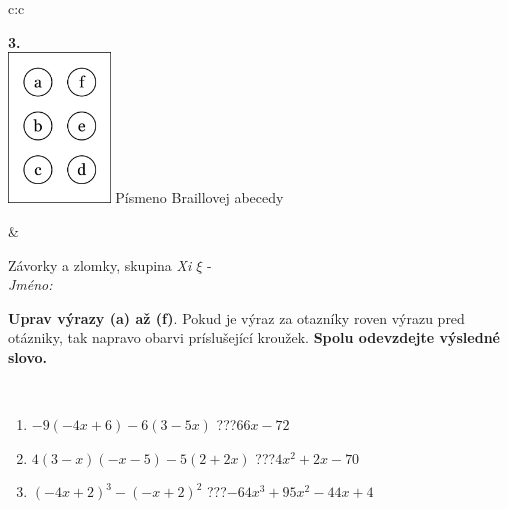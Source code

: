 \documentclass[10pt]{report}
\begin{document}
\begin{tabular}{c:c}
\begin{minipage}[c][104.5mm][t]{0.5\linewidth}
\begin{center}
\begin{minipage}{0.79\linewidth}
\begin{center}
\begin{varwidth}{\linewidth}
\begin{enumerate}
\end{enumerate}
\end{varwidth}
\end{center}
\end{minipage}
\begin{minipage}{0.20\linewidth}
\begin{center}
{\Huge\bfseries 3.} \\[2mm]
\includegraphics[height=40mm]{../images/braille.png}
{\small Písmeno Braillovej abecedy}
\end{center}
\end{minipage}
\end{center}
\end{minipage}
&
\begin{minipage}[c][104.5mm][t]{0.5\linewidth}
\begin{center}
\vspace{7mm}
{\huge Závorky a zlomky, skupina \textit{Xi $\xi$} -}\\[5mm]
\textit{Jméno:}\phantom{xxxxxxxxxxxxxxxxxxxxxxxxxxxxxxxxxxxxxxxxxxxxxxxxxxxxxxxxxxxxxxxxx}\\[5mm]
\begin{minipage}{0.95\linewidth}
\begin{center}
\textbf{Uprav výrazy (a) až (f)}. Pokud je výraz za otazníky roven výrazu pred otázniky, tak napravo obarvi príslušející kroužek. \textbf{Spolu odevzdejte výsledné slovo.}
\end{center}
\end{minipage}
\\[1mm]
\begin{minipage}{0.79\linewidth}
\begin{center}
\begin{varwidth}{\linewidth}
\begin{enumerate}
\normalsize
\item $-9(-4x+6)-6(3-5x)$\quad \dotfill\; ???\;\dotfill \quad $66x-72$
\item $4(3-x)(-x-5)-5(2+2x)$\quad \dotfill\; ???\;\dotfill \quad $4x^2+2x-70$
\item $(-4x+2)^3-(-x+2)^2$\quad \dotfill\; ???\;\dotfill \quad $-64x^3+95x^2-44x+4$

\end{enumerate}
\end{varwidth}
\end{center}
\end{minipage}
\end{center}
\end{minipage}
\end{tabular}
\end{document}
